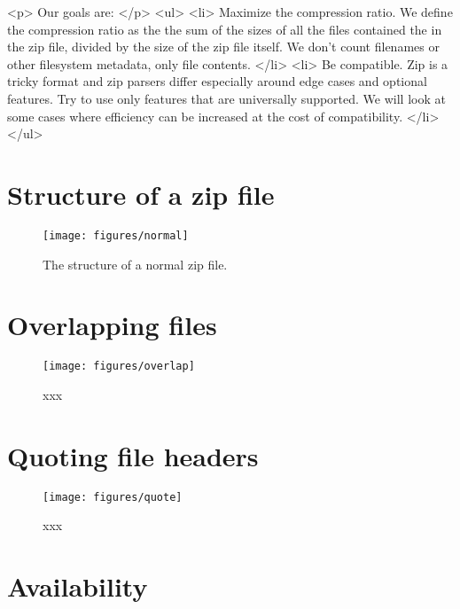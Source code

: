 \documentclass[letterpaper,twocolumn,10pt]{article}
\begin{document}
<p>
Our goals are:
</p>
<ul>
<li>
Maximize the compression ratio.
We define the compression ratio as the the sum of the sizes
of all the files contained the in the zip file,
divided by the size of the zip file itself.
We don't count filenames or other filesystem metadata,
only file contents.
</li>
<li>
Be compatible.
Zip is a tricky format and zip parsers differ especially
around edge cases and optional features.
Try to use only features that are universally supported.
We will look at some cases where efficiency can be increased
at the cost of compatibility.
</li>
</ul>

\section{Structure of a zip file}

\begin{figure*}
\texttt{[image: figures/normal]}
\caption{
The structure of a normal zip file.
}
\label{fig:normal}
\end{figure*}

\section{Overlapping files}

\cite{SAR-PR-2006-04}

\begin{figure*}
\texttt{[image: figures/overlap]}
\caption{
xxx
}
\label{fig:overlap}
\end{figure*}

\section{Quoting file headers}

\begin{figure*}
\texttt{[image: figures/quote]}
\caption{
xxx
}
\label{fig:quote}
\end{figure*}


\section*{Availability}




\end{document}

